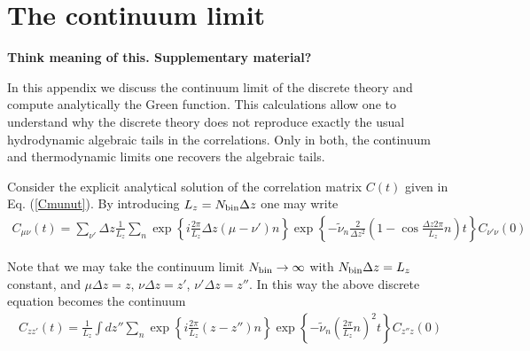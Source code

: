 \documentclass[a4paper,openright,12pt]{book}
\newcommand{\Note}[1]{{\bf \color{red}#1}}    %
\newcommand{\Pendiente}[1]{{\color{green}#1}} %
\begin{document}
\chapter{The continuum limit}
\label{Ap:Cont}
\Note{Think meaning of this. Supplementary material?}
\Pendiente{
In this appendix we discuss the continuum limit of the discrete theory
and compute analytically the  Green function.  This calculations allow
one to understand  why the discrete theory does  not reproduce exactly
the usual hydrodynamic  algebraic tails in the  correlations.  Only in
both,  the  continuum  and   thermodynamic  limits  one  recovers  the
algebraic tails.

Consider the  explicit analytical  solution of the  correlation matrix
$C(t)$  given  in  Eq. (\ref{Cmunut}).   By  introducing  $L_z={N_{\rm
    bin}}\Delta z$ one may write
\begin{align}
  C_{\mu\nu}(t)=\sum_{\nu'}\Delta z \frac{1}{L_z}\sum_{n}\exp\left\{i\frac{2\pi}{L_z}\Delta z (\mu-\nu')n\right\}
\exp\left\{-\tilde{\nu}_n\frac{2}{\Delta z^2}\left(1-\cos\frac{\Delta z 2\pi}{L_z}n\right)t\right\}C_{\nu'\nu}(0)
\end{align}

Note that we may take the continuum limit ${N_{\rm bin}}\to\infty$ with ${N_{\rm bin}}\Delta z=L_z$ constant, and $\mu\Delta z=z$, $\nu \Delta z =z'$, $ \nu' \Delta z =z''$. In this way
the above discrete equation becomes the continuum
\begin{align}
  C_{zz'}(t)=\frac{1}{L_z}\int dz''\sum_{n}\exp\left\{i\frac{2\pi}{L_z}(z-z'')n\right\}
\exp\left\{-\tilde{\nu}_n\left(\frac{2\pi}{L_z}n\right)^2t\right\}C_{z''z}(0)
\end{align}

}
\end{document}
